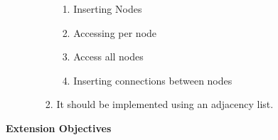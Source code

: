 \begin{flushleft}
\begin{enumerate}
\begin{enumerate}
\begin{enumerate}
                    \begin{enumerate}
                        \item Inserting Nodes
                        \item Accessing per node
                        \item Access all nodes 
                        \item Inserting connections between nodes
                    \end{enumerate}
                    \item It should be implemented using an adjacency list.
                \end{enumerate}
            \end{enumerate}
            \bk
        \end{enumerate}  
        \vspace{1cm}    
        \centerline{\large\textbf{Extension Objectives}}
        \vspace{1cm}


\end{flushleft}
